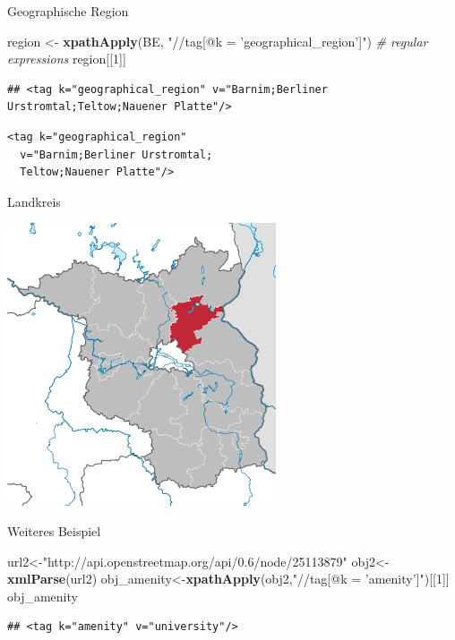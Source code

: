 \documentclass[ignorenonframetext,]{beamer}
\newenvironment{Shaded}{\begin{snugshade}}{\end{snugshade}}
\newcommand{\CommentTok}[1]{\textcolor[rgb]{0.56,0.35,0.01}{\textit{#1}}}
\newcommand{\DecValTok}[1]{\textcolor[rgb]{0.00,0.00,0.81}{#1}}
\newcommand{\KeywordTok}[1]{\textcolor[rgb]{0.13,0.29,0.53}{\textbf{#1}}}
\newcommand{\NormalTok}[1]{#1}
\newcommand{\StringTok}[1]{\textcolor[rgb]{0.31,0.60,0.02}{#1}}
\begin{document}
\begin{frame}[fragile]{Geographische Region}
\protect\hypertarget{geographische-region}{}

\begin{Shaded}
\begin{Highlighting}[]
\NormalTok{region <-}\StringTok{ }\KeywordTok{xpathApply}\NormalTok{(BE,}
  \StringTok{"//tag[@k = 'geographical_region']"}\NormalTok{)}
\CommentTok{# regular expressions}
\NormalTok{region[[}\DecValTok{1}\NormalTok{]]}
\end{Highlighting}
\end{Shaded}

\begin{verbatim}
## <tag k="geographical_region" v="Barnim;Berliner Urstromtal;Teltow;Nauener Platte"/>
\end{verbatim}

\begin{verbatim}
<tag k="geographical_region" 
  v="Barnim;Berliner Urstromtal;
  Teltow;Nauener Platte"/>
\end{verbatim}

\end{frame}

\begin{frame}{Landkreis}
\protect\hypertarget{landkreis}{}

\includegraphics{figure/Barnim.png}

\end{frame}

\begin{frame}[fragile]{Weiteres Beispiel}
\protect\hypertarget{weiteres-beispiel}{}

\begin{Shaded}
\begin{Highlighting}[]
\NormalTok{url2<-}\StringTok{"http://api.openstreetmap.org/api/0.6/node/25113879"}
\NormalTok{obj2<-}\KeywordTok{xmlParse}\NormalTok{(url2)}
\NormalTok{obj_amenity<-}\KeywordTok{xpathApply}\NormalTok{(obj2,}\StringTok{"//tag[@k = 'amenity']"}\NormalTok{)[[}\DecValTok{1}\NormalTok{]]}
\NormalTok{obj_amenity}
\end{Highlighting}
\end{Shaded}

\begin{verbatim}
## <tag k="amenity" v="university"/>
\end{verbatim}

\end{frame}
\end{document}
